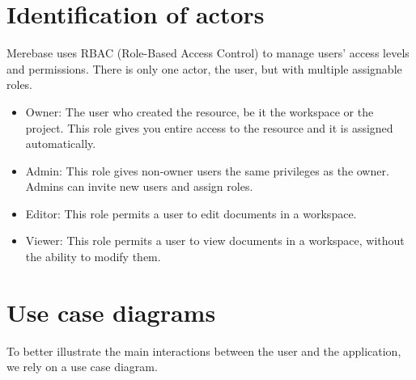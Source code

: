 \section{Identification of actors}

Merebase uses RBAC (Role-Based Access Control) to manage users' access
levels and permissions. There is only one actor, the user, but with
multiple assignable roles.

\begin{itemize}
	\item
	      Owner: The user who created the resource, be it the workspace or the
	      project. This role gives you entire access to the resource and it is
	      assigned automatically.
	\item
	      Admin: This role gives non-owner users the same privileges as the
	      owner. Admins can invite new users and assign roles.
	\item
	      Editor: This role permits a user to edit documents in a workspace.
	\item
	      Viewer: This role permits a user to view documents in a workspace,
	      without the ability to modify them.
\end{itemize}

\section{Use case diagrams}

To better illustrate the main interactions between the user and the
application, we rely on a use case diagram.



